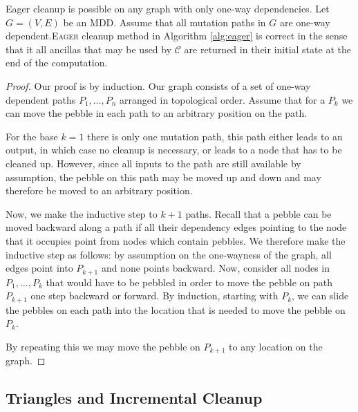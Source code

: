 
\begin{theorem}

Eager cleanup is possible on any graph with only one-way dependencies.  Let
$G=(V,E)$ be an MDD.  Assume that all mutation paths in $G$ are one-way
dependent.\textsc{Eager} cleanup method in Algorithm
\ref{alg:eager} is correct in the sense that it all ancillas that may be used by
${\mathcal C}$ are returned in their initial state at the end of the
computation.

\end{theorem}

\begin{proof}

Our proof is by induction. Our graph consists of a set of one-way dependent
paths $P_1,\dotsc,P_n$ arranged in topological order. Assume that for a $P_k$ we
can move the pebble in each path to an arbitrary position on the path.

For the base $k=1$ there is only one mutation path, this path either leads to
an output, in which case no cleanup is necessary, or leads to a node that has
to be cleaned up. However, since all inputs to the path are still available by
assumption, the pebble on this path may be moved up and down and may therefore
be moved to an arbitrary position. 

Now, we make the inductive step to $k+1$ paths. Recall that a pebble can be
moved backward along a path if all their dependency edges pointing to the node
that it occupies point from nodes which contain pebbles. We therefore make the
inductive step as follows: by assumption on the one-wayness of the graph, all
edges point into $P_{k+1}$ and none points backward. Now, consider all nodes in
$P_1, \ldots, P_k$ that would have to be pebbled in order to move the pebble on
path $P_{k+1}$ one step backward or forward. By induction, starting with $P_k$,
we can slide the pebbles on each path into the location that is needed to move
the pebble on $P_k$. 

By repeating this we may move the pebble on $P_{k+1}$ to any location on the
graph.

\end{proof}

\subsection{Triangles and Incremental Cleanup}

